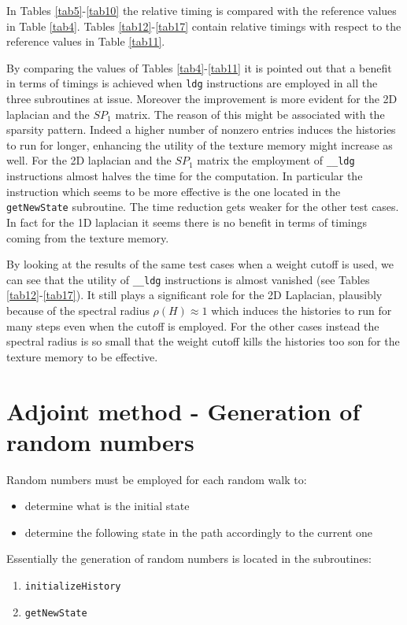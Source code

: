 \documentclass[a4paper,10pt]{article}
\begin{document}
In Tables \ref{tab5}-\ref{tab10} the relative timing is compared with the 
reference values in Table \ref{tab4}. Tables \ref{tab12}-\ref{tab17} contain 
relative timings with respect to the reference values in Table \ref{tab11}.


By comparing the values of Tables \ref{tab4}-\ref{tab11} it is pointed out that 
a benefit in terms of timings is achieved 
when \texttt{ldg} instructions are employed in all the three subroutines at 
issue.
Moreover the improvement is more 
evident for the 2D laplacian and the $SP_1$ matrix. The reason of this might be 
associated with the sparsity pattern. 
Indeed a higher number of nonzero entries induces the histories to run for 
longer, enhancing the utility of the 
texture memory might increase as well. For the 2D laplacian and the $SP_1$ 
matrix the employment of \texttt{\_\_ldg} 
instructions almost halves the time for the computation. 
In particular the instruction which seems to be more effective is the one 
located in the \texttt{getNewState} subroutine.
The time reduction gets 
weaker for the other test cases. In fact for the 1D laplacian it seems there is 
no benefit in terms of timings coming from the texture memory. 

By looking at the results of the same test cases when a weight cutoff is used, 
we can see that the utility of \texttt{\_\_ldg} instructions is almost vanished 
(see 
Tables \ref{tab12}-\ref{tab17}). It still plays a significant role for the 2D 
Laplacian, plausibly because of the spectral radius $\rho(H)\approx 1$ which 
induces the histories to run for many steps even when the cutoff is employed. 
For the other cases instead the spectral radius is so small that the weight 
cutoff kills the histories too son for the texture memory to be effective.

\section{Adjoint method - Generation of random numbers}

Random numbers must be employed for each random walk to:
\begin{itemize}
 \item determine what is the initial state
 \item determine the following state in the path accordingly to the current one
\end{itemize}


Essentially the generation of random numbers is located in the subroutines:
\begin{enumerate}
\item \texttt{initializeHistory}
\item \texttt{getNewState}
\end{enumerate}
\end{document}
